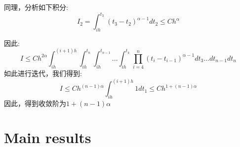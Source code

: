 \documentclass[12pt,final]{article}
\makeatletter
\numberwithin{equation}{section}
\numberwithin{figure}{section}
\numberwithin{table}{section}
\theoremstyle{plain}
\renewcommand{\proofname}{proof}
\theoremstyle{definition}
\theoremstyle{remark}
\renewenvironment{proof}[1][\proofname]{\par
  \pushQED{\qed}%
  \normalfont \topsep6\p@\@plus6\p@\relax
  \trivlist\item[\hskip\labelsep
  \bfseries #1\@addpunct{\,:\,}]\ignorespaces
}{%
  \popQED\endtrivlist\@endpefalse
}
\makeatother
\begin{document}
\begin{proof}
	同理，分析如下积分:
	\begin{equation*}
		I_{2} = \int_{ih}^{t_{3}}(t_{3}-t_{2})^{\alpha -1}
		dt_{2} \le Ch^\alpha 
	\end{equation*}
	
	因此:
	\begin{equation*}
		I \le Ch^{2\alpha}
		\int_{ih}^{(i+1)h}\int_{ih}^{t_n}\int_{ih}^{t_{n-1}} \ldots \int_{ih}^{t_{4}} 
		\prod_{i=4}^{n}(t_i-t_{i-1})^{\alpha -1} dt_{3} \ldots dt_{n-1}dt_n
	\end{equation*}
	如此进行迭代，我们得到:
	\begin{equation*}
		I \le Ch^{(n-1)\alpha}\int_{ih}^{(i+1)h} 1 dt_1 \le Ch^{1+(n-1)\alpha}
	\end{equation*}
	因此，得到收敛阶为$1+(n-1)\alpha$
\end{proof}

\section{Main results}
\end{document}
